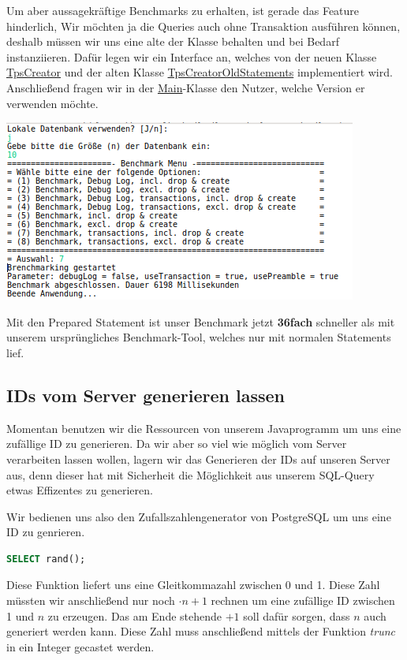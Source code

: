 Um aber aussagekräftige Benchmarks zu erhalten, ist gerade das Feature
hinderlich, Wir möchten ja die Queries auch ohne Transaktion ausführen können,
deshalb müssen wir uns eine alte  der Klasse behalten und bei Bedarf
instanziieren. Dafür legen wir ein Interface an, welches von der neuen Klasse
\hyperref[lst:tpsv2]{TpsCreator} und der alten Klasse
\hyperref[lst:tpsoldv2]{TpsCreatorOldStatements} implementiert wird.
Anschließend fragen wir in der \hyperref[lst:mainv2]{Main}-Klasse den
Nutzer, welche Version er verwenden möchte.


\begin{center}
\includegraphics[scale=0.8]{Bilder/Auswahl_016.png}
\end{center}
Mit den Prepared Statement ist unser Benchmark jetzt \textbf{36fach} schneller
als mit unserem ursprüngliches Benchmark-Tool, welches nur mit normalen
Statements lief.

\subsection{IDs vom Server generieren lassen}
Momentan benutzen wir die Ressourcen von unserem Javaprogramm um uns eine
zufällige ID zu generieren. Da wir aber so viel wie möglich vom Server
verarbeiten lassen wollen, lagern wir das Generieren der IDs auf unseren Server
aus, denn dieser hat mit Sicherheit die Möglichkeit aus unserem SQL-Query etwas
Effizentes zu generieren.

Wir bedienen uns also den Zufallszahlengenerator von PostgreSQL um uns
eine ID zu genrieren.
\begin{lstlisting}[language=sql]
SELECT rand();
\end{lstlisting}

Diese Funktion liefert uns eine Gleitkommazahl zwischen 0 und 1. Diese Zahl
müssten wir anschließend nur noch $ \cdot  n + 1 $ rechnen um eine zufällige ID
zwischen 1 und $n$ zu erzeugen. Das am Ende stehende $ + 1$ soll dafür sorgen,
dass $n$ auch generiert werden kann. Diese Zahl muss anschließend mittels der
Funktion \textit{trunc} in ein Integer gecastet werden.

